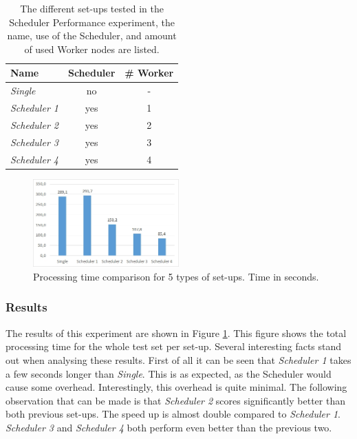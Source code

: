 \documentclass{acm_proc_article-sp}
\begin{document}
\begin{table}
	\centering
	\begin{tabular}{| l | c | c |}
		\hline
		Name & Scheduler & \# Worker \\ \hline \hline
		\emph{Single} & no & - \\ \hline
		\emph{Scheduler 1} & yes & 1 \\ \hline
		\emph{Scheduler 2} & yes & 2 \\ \hline
		\emph{Scheduler 3} & yes & 3 \\ \hline
		\emph{Scheduler 4} & yes & 4 \\ \hline
	\end{tabular}
	\caption{The different set-ups tested in the Scheduler Performance experiment, the name, use of the Scheduler, and amount of used Worker nodes are listed.}
	\label{tbl:setups}
\end{table}

\begin{figure}
	\centering
	\includegraphics[width=0.5\textwidth]{images/diagram_total_processing.jpg}
	\caption{Processing time comparison for 5 types of set-ups. Time in seconds.}
	\label{fig:diagram_total_processing}
\end{figure}

\newpage

\subsubsection{Results}

The results of this experiment are shown in Figure \ref{fig:diagram_total_processing}.
This figure shows the total processing time for the whole test set per set-up.
Several interesting facts stand out when analysing these results.
First of all it can be seen that \emph{Scheduler 1} takes a few seconds longer than \emph{Single}.
This is as expected, as the Scheduler would cause some overhead.
Interestingly, this overhead is quite minimal.
The following observation that can be made is that \emph{Scheduler 2} scores significantly better than both previous set-ups.
The speed up is almost double compared to \emph{Scheduler 1}.
\emph{Scheduler 3} and \emph{Scheduler 4} both perform even better than the previous two.
\end{document}
